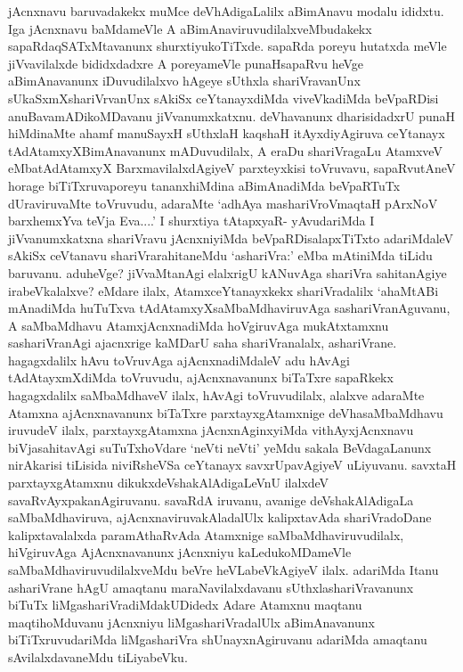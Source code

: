 
\begin{artha}
jAcnxnavu baruvadakekx muMce deVhAdigaLalilx aBimAnavu modalu ididxtu. Iga jAcnxnavu baMdameVle A aBimAnaviruvudilalxveMbudakekx sapaRdaqSATxMtavanunx shurxtiyukoTiTxde. sapaRda poreyu hutatxda meVle jiVvavilalxde bididxdadxre A poreyameVle punaHsapaRvu heVge aBimAnavanunx iDuvudilalxvo hAgeye sUthxla shariVravanUnx sUkaSxmXshariVrvanUnx sAkiSx ceYtanayxdiMda viveVkadiMda beVpaRDisi anuBavamADikoMDavanu jiVvanumxkatxnu. deVhavanunx dharisidadxrU punaH hiMdinaMte ahamf manuSayxH sUthxlaH kaqshaH itAyxdiyAgiruva ceYtanayx tAdAtamxyXBimAnavanunx mADuvudilalx, A eraDu shariVragaLu AtamxveV eMbatAdAtamxyX BarxmavilalxdAgiyeV parxteyxkisi toVruvavu, sapaRvutAneV horage biTiTxruvaporeyu tananxhiMdina aBimAnadiMda beVpaRTuTx dUraviruvaMte toVruvudu, adaraMte `adhAya mashariVroV\s maqtaH pArxNoV barxhemxYva teVja Eva....' I shurxtiya tAtapxyaR- yAvudariMda I jiVvanumxkatxna shariVravu jAcnxniyiMda beVpaRDisalapxTiTxto adariMdaleV sAkiSx ceVtanavu shariVrarahitaneMdu `ashariVra:' eMba mAtiniMda tiLidu baruvanu. aduheVge? jiVvaMtanAgi elalxrigU kANuvAga shariVra sahitanAgiye irabeVkalalxve? eMdare ilalx, AtamxceYtanayxkekx shariVradalilx `ahaMtABi mAnadiMda huTuTxva tAdAtamxyXsaMbaMdhaviruvAga  sashariVranAguvanu, A saMbaMdhavu AtamxjAcnxnadiMda hoVgiruvAga mukAtxtamxnu sashariVranAgi ajacnxrige kaMDarU saha shariVranalalx, ashariVrane.  hagagxdalilx hAvu toVruvAga ajAcnxnadiMdaleV adu hAvAgi tAdAtayxmXdiMda toVruvudu, ajAcnxnavanunx biTaTxre sapaRkekx hagagxdalilx saMbaMdhaveV ilalx, hAvAgi toVruvudilalx, alalxve adaraMte Atamxna ajAcnxnavanunx biTaTxre parxtayxgAtamxnige deVhasaMbaMdhavu iruvudeV ilalx, parxtayxgAtamxna jAcnxnAginxyiMda vithAyxjAcnxnavu biVjasahitavAgi suTuTxhoVdare `neVti neVti' yeMdu sakala BeVdagaLanunx nirAkarisi tiLisida niviRsheVSa ceYtanayx savxrUpavAgiyeV uLiyuvanu. savxtaH parxtayxgAtamxnu dikukxdeVshakAlAdigaLeVnU ilalxdeV savaRvAyxpakanAgiruvanu. savaRdA iruvanu, avanige deVshakAlAdigaLa saMbaMdhaviruva, ajAcnxnaviruvakAladalUlx kalipxtavAda shariVradoDane kalipxtavalalxda paramAthaRvAda Atamxnige saMbaMdhaviruvudilalx, hiVgiruvAga AjAcnxnavanunx jAcnxniyu kaLedukoMDameVle saMbaMdhaviruvudilalxveMdu beVre heVLabeVkAgiyeV ilalx. adariMda Itanu ashariVrane hAgU amaqtanu maraNavilalxdavanu sUthxlashariVravanunx biTuTx liMgashariVradiMdakUDidedx Adare Atamxnu maqtanu maqtihoMduvanu jAcnxniyu liMgashariVradalUlx aBimAnavanunx biTiTxruvudariMda liMgashariVra shUnayxnAgiruvanu adariMda amaqtanu sAvilalxdavaneMdu tiLiyabeVku. 
\end{artha}


